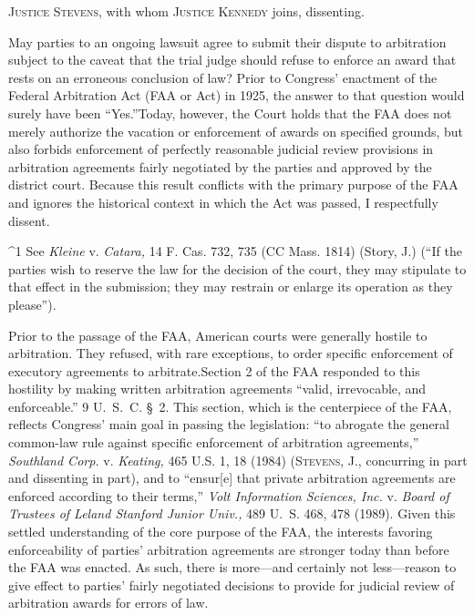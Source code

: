 
\setcounter{page}{592}

  \textsc{Justice Stevens,} with whom \textsc{Justice Kennedy} joins, dissenting.

  May parties to an ongoing lawsuit agree to submit their dispute to
arbitration subject to the caveat that the trial judge should refuse to
enforce an award that rests on an erroneous conclusion of law? Prior to
Congress' enactment of the Federal Arbitration Act (FAA or Act) in
1925, the answer to that question would surely have been ``Yes.''\footnotemark[1]
Today, however, the Court holds that the FAA does not \newpage  merely
authorize the vacation or enforcement of awards on specified grounds,
but also forbids enforcement of perfectly reasonable judicial review
provisions in arbitration agreements fairly negotiated by the parties
and approved by the district court. Because this result conflicts with
the primary purpose of the FAA and ignores the historical context in
which the Act was passed, I respectfully dissent.

^1 See \emph{Kleine} v. \emph{Catara,} 14 F. Cas. 732, 735 (CC Mass. 1814)
(Story, J.) (``If the parties wish to reserve the law for the decision
of the court, they may stipulate to that effect in the submission; they
may restrain or enlarge its operation as they please'').

  Prior to the passage of the FAA, American courts were generally
hostile to arbitration. They refused, with rare exceptions, to order
specific enforcement of executory agreements to arbitrate.\footnotemark[2] Section
2 of the FAA responded to this hostility by making written arbitration
agreements ``valid, irrevocable, and enforceable.'' 9 U.~S.~C.
\S~2. This section, which is the centerpiece of the FAA, reflects
Congress' main goal in passing the legislation: ``to abrogate the
general common-law rule against specific enforcement of arbitration
agreements,'' \emph{Southland Corp.} v. \emph{Keating,} 465 U.S. 1, 18
(1984) (\textsc{Stevens,} J., concurring in part and dissenting in part),
and to ``ensur[e] that private arbitration agreements are enforced
according to their terms,'' \emph{Volt Information Sciences, Inc.} v.
\emph{Board of Trustees of Leland Stanford Junior Univ.,} 489 U.~S. 468,
478 (1989). Given this settled understanding of the core purpose of
the FAA, the interests favoring enforceability of parties' arbitration
agreements are stronger today than before the FAA was enacted. As such,
there is more---and certainly not less---reason to give effect to
parties' fairly negotiated decisions to provide for judicial review of
arbitration awards for errors of law.

